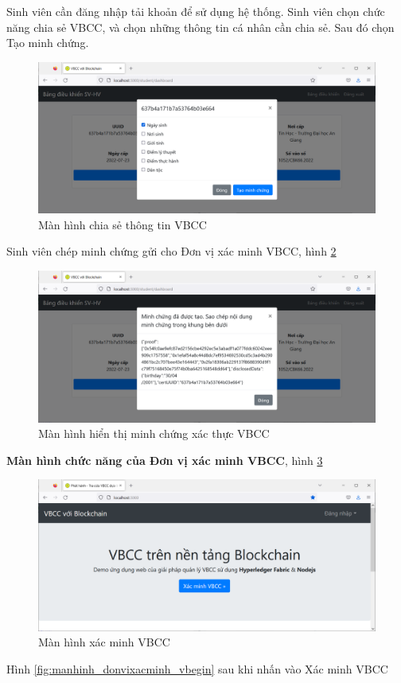 Sinh viên cần đăng nhập tải khoản để sử dụng hệ thống.
Sinh viên chọn chức năng chia sẻ VBCC, và chọn những thông tin cá nhân cần chia sẻ. Sau đó chọn Tạo minh chứng.

\begin{figure}[H]
\centering
\includegraphics[width=.9\linewidth]{img/sv_chiase.PNG}
\caption{Màn hình chia sẻ thông tin VBCC}
\label{fig:sv_chiase}
\end{figure}

Sinh viên chép minh chứng gửi cho Đơn vị xác minh VBCC, hình \ref{fig:sv_minhchung}

\begin{figure}[H]
\centering
\includegraphics[width=.9\linewidth]{img/sv_minhchung.PNG}
\caption{Màn hình hiển thị minh chứng xác thực VBCC}
\label{fig:sv_minhchung}
\end{figure}

\textbf{Màn hình chức năng của Đơn vị xác minh VBCC}, hình \ref{fig:manhinh_donvixacminh}
\begin{figure}[H]
\centering
\includegraphics[width=.9\linewidth]{img/manhinh_donvixacminh.PNG}
\caption{Màn hình xác minh VBCC}
\label{fig:manhinh_donvixacminh}
\end{figure}
Hình \ref{fig:manhinh_donvixacminh_vbegin} sau khi nhấn vào Xác minh VBCC

